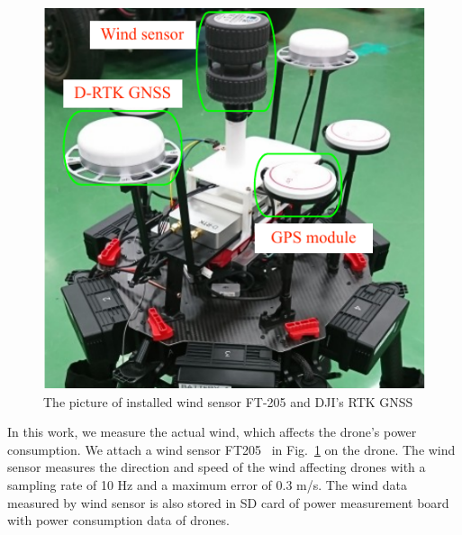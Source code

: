 \documentclass[journal]{./template/IEEEtran}
\begin{document}
\begin{figure}[ht]
\centering\includegraphics[scale=0.8]{fig5/wind_sensor.pdf}
\caption{The picture of installed wind sensor FT-205 and DJI's RTK GNSS}
\label{fig:wind_sensor}
\end{figure}

In this work, we measure the actual wind, which affects the drone's power consumption. We attach a wind sensor FT205~\cite{ref_15} in Fig.~\ref{fig:wind_sensor} on the drone. 
The wind sensor measures the direction and speed of the wind affecting drones with a sampling rate of 10 Hz and a maximum error of 0.3 m/s.
The wind data measured by wind sensor is also stored in SD card of power measurement board with power consumption data of drones.
\end{document}
